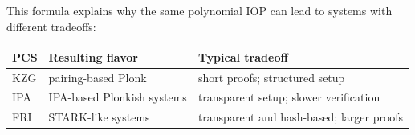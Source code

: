 This formula explains why the same polynomial IOP can lead to systems with different tradeoffs:
\begin{center}
\small
\begin{tabular}{@{}p{}p{}p{}@{}}
\toprule
PCS & Resulting flavor & Typical tradeoff \\
\midrule
KZG \cite{KateZaveruchaGoldberg2010} & pairing-based Plonk & short proofs; structured setup \\
IPA \cite{Bulletproofs2018} & IPA-based Plonkish systems & transparent setup; slower verification \\
FRI \cite{BenSassonBentovHoreshRiabzev2018FRI} & STARK-like systems & transparent and hash-based; larger proofs \\
\bottomrule
\end{tabular}
\end{center}
